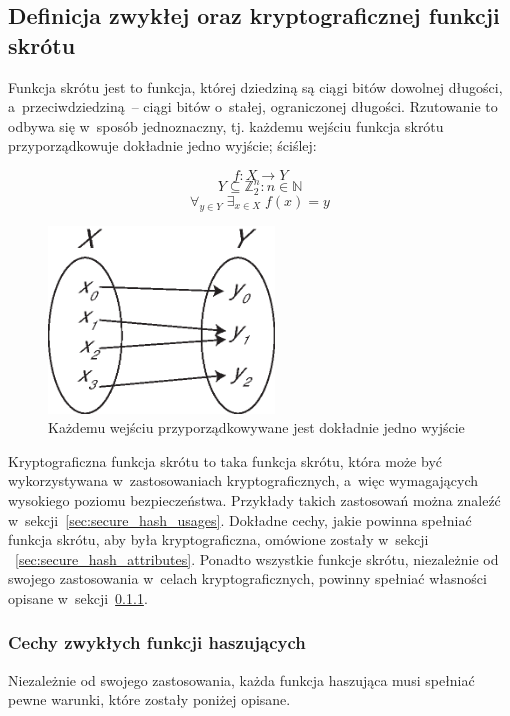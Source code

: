 \subsection{Definicja zwykłej oraz kryptograficznej funkcji skrótu}
Funkcja skrótu jest to funkcja, której dziedziną są ciągi bitów dowolnej
długości, a~przeciwdziedziną~-- ciągi bitów o~stałej, ograniczonej długości.
Rzutowanie to odbywa się w~sposób jednoznaczny, tj. każdemu wejściu funkcja
skrótu przyporządkowuje dokładnie jedno wyjście; ściślej:

$$ f \colon X \to Y $$
$$ Y \subseteq \mathbb{Z}_2^{n} : n \in \mathbb{N}$$
$$ \forall_{y \in Y} \; \exists_{x \in X} \; f(x)=y $$

\begin{figure}[htb!]
    \includegraphics[width=6cm]{img/surjection.eps}
    \caption{Każdemu wejściu przyporządkowywane jest dokładnie jedno wyjście}
    \label{fig:surjection}
\end{figure}

Kryptograficzna funkcja skrótu to taka funkcja skrótu, która może być
wykorzystywana w~zastosowaniach kryptograficznych, a~więc wymagających
wysokiego poziomu bezpieczeństwa. Przykłady takich zastosowań można znaleźć
w~sekcji~\ref{sec:secure_hash_usages}. Dokładne cechy, jakie powinna spełniać
funkcja skrótu, aby była kryptograficzna, omówione zostały w~sekcji
~\ref{sec:secure_hash_attributes}. Ponadto wszystkie funkcje skrótu,
niezależnie od swojego zastosowania w~celach kryptograficznych, powinny
spełniać własności opisane w~sekcji~\ref{sec:common_hash_attributes}.



\subsubsection{Cechy zwykłych funkcji haszujących}
\label{sec:common_hash_attributes}%
Niezależnie od swojego zastosowania, każda funkcja haszująca musi spełniać
pewne warunki, które zostały poniżej opisane.

